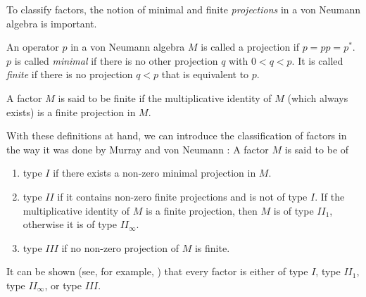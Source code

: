 To classify factors, the notion of minimal and finite \emph{projections} in a von Neumann algebra is important.

\begin{defn}[Projection]
	An operator $p$ in a von Neumann algebra $M$ is called a projection if $p=pp=p^*$. $p$ is called \emph{minimal} if there is no other projection $q$ with $0<q<p$. It is called \emph{finite} if there is no projection $q<p$ that is equivalent to $p$.
\end{defn}

\begin{defn}
	A factor $M$ is said to be finite if the multiplicative identity of $M$ (which always exists) is a finite projection in $M$.
\end{defn}

With these definitions at hand, we can introduce the classification of factors in the way it was done by Murray and von Neumann \cite{Murray1936}: A factor $M$ is said to be of
	\begin{enumerate}
		\item type $I$ if there exists a non-zero minimal projection in $M$.
		\item type $II$ if it contains non-zero finite projections and is not of type $I$. If the multiplicative identity of $M$ is a finite projection, then $M$ is of type $II_1$, otherwise it is of type $II_\infty$.
		\item type $III$ if no non-zero projection of $M$ is finite.
	\end{enumerate}
It can be shown (see, for example, \cite{Takesaki1979}) that every factor is either of type $I$, type $II_1$, type $II_\infty$, or type $III$.

